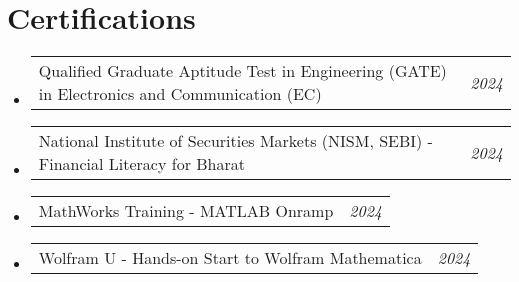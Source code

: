 \documentclass[a4paper,11pt]{article}
\makeatletter
\newcommand{\resumePOR}[3]{
\vspace{0.5mm}\item
    \begin{tabular*}{0.97\textwidth}[t]{l@{\extracolsep{\fill}}r}
        \textbf{#1}\hspace{0.3mm}#2 & \textit{\small{#3}} 
    \end{tabular*}
    \vspace{-2mm}
}
\newcommand{\resumeSubHeadingListStart}{\begin{itemize}[leftmargin=*,labelsep=1mm]}
\newcommand{\resumeSubHeadingListEnd}{\end{itemize}\vspace{2mm}}
\makeatother
\begin{document}
\section{\textbf{Certifications}}
\vspace{-0.2mm}
\resumeSubHeadingListStart
\resumePOR{}{\footnotesize {Qualified Graduate Aptitude Test in Engineering (GATE) in Electronics and Communication (EC)}  }{\href{https://drive.google.com/file/d/1shcvrExVXRHoQDvvzEtomb_LwSz4b1zZ/view?usp=sharing}{\textcolor{darkblue}{\faCertificate}} 2024}
\resumePOR{}{\footnotesize {National Institute of Securities Markets (NISM, SEBI) - Financial Literacy for Bharat}  }{\href{https://drive.google.com/file/d/17fbsZgaEea0BV6-r4r2XJ_5Jf-J3Rga5/view?usp=sharing}{\textcolor{darkblue}{\faCertificate}} 2024}
\resumePOR{}{\footnotesize {MathWorks Training - MATLAB Onramp}  }{\href{https://drive.google.com/file/d/1mkDalK8A1keLxXXYWNhQnshTT9sq1vor/view?usp=sharing}{\textcolor{darkblue}{\faCertificate}} 2024}
\resumePOR{}{\footnotesize {Wolfram U - Hands-on Start to Wolfram Mathematica}  }{\href{https://drive.google.com/file/d/1UMcH0YTn9qbdHo8LIr4tHWEiZi-Xrejt/view?usp=sharing}{\textcolor{darkblue}{\faCertificate}} 2024}
\resumeSubHeadingListEnd
\vspace{-6mm}
\end{document}
